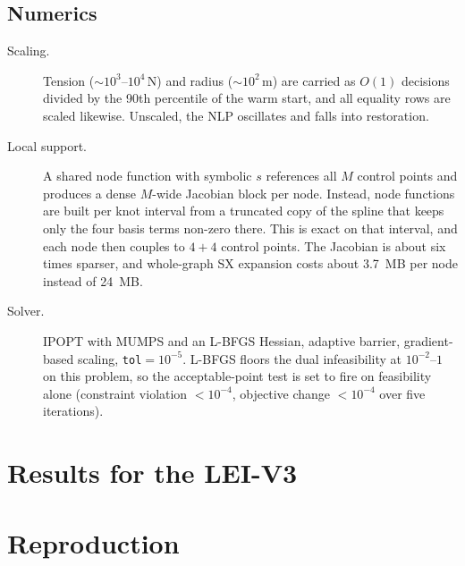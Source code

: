 \documentclass[11pt,a4paper]{article}
\newcommand{\code}[1]{\texttt{\small #1}}
\begin{document}
\subsection{Numerics}
\label{sec:numerics}

\begin{description}
  \item[Scaling.] Tension ($\sim10^3$--$10^4$\,N) and radius ($\sim10^2$\,m)
        are carried as $O(1)$ decisions divided by the 90th percentile of
        the warm start, and all equality rows are scaled likewise. Unscaled,
        the NLP oscillates and falls into restoration.
  \item[Local support.] A shared node function with symbolic $s$ references all
        $M$ control points and produces a dense $M$-wide Jacobian block per node.
        Instead, node functions are built per knot interval from a truncated
        copy of the spline that keeps only the four basis terms non-zero there.
        This is exact on that interval, and each node then couples to $4+4$
        control points. The Jacobian is about six times sparser, and
        whole-graph SX expansion costs about \SI{3.7}{MB} per node instead of
        \SI{24}{MB}.
  \item[Solver.] IPOPT with MUMPS and an L-BFGS Hessian, adaptive barrier,
        gradient-based scaling, \code{tol}$=10^{-5}$. L-BFGS floors the dual
        infeasibility at $10^{-2}$--$1$ on this problem, so the acceptable-point
        test is set to fire on feasibility alone (constraint violation
        $<10^{-4}$, objective change $<10^{-4}$ over five iterations).
\end{description}

\section{Results for the LEI-V3}
\label{sec:results}



\section{Reproduction}
\end{document}
